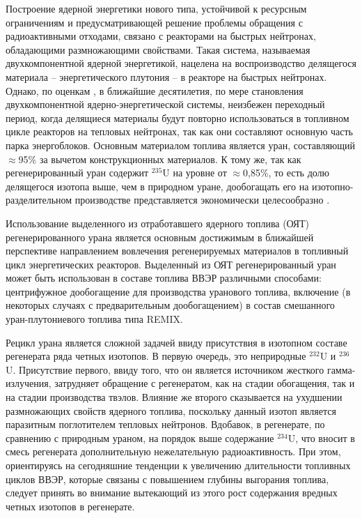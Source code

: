 {\actuality}
Построение ядерной энергетики нового типа, устойчивой к ресурсным ограничениям и предусматривающей решение проблемы обращения с радиоактивными отходами, связано с реакторами на быстрых нейтронах, обладающими размножающими свойствами. Такая система, называемая двухкомпонентной ядерной энергетикой, нацелена на воспроизводство делящегося материала -- энергетического  плутония -- в реакторе на быстрых нейтронах. Однако, по оценкам \cite{andrianovaPERSPEKTIVNYETOPLIVNYEZAGRUZKI2015}, в ближайшие десятилетия, по мере становления двухкомпонентной ядерно-энергетической системы, неизбежен переходный период, когда делящиеся материалы будут повторно использоваться в топливном цикле реакторов на тепловых нейтронах, так как они составляют основную часть парка энергоблоков. Основным материалом топлива является уран, составляющий $\approx$95\% за вычетом конструкционных материалов. К тому же, так как регенерированный уран содержит $^{235}$U на уровне от $\approx$0,85\%, то есть долю делящегося изотопа выше, чем в природном уране, дообогащать его на изотопно-разделительном производстве представляется экономически целесообразно \cite{NikipelovNikipelovSudby}. 

Использование выделенного из отработавшего ядерного топлива (ОЯТ) регенерированного урана является основным достижимым в ближайшей перспективе направлением вовлечения регенерируемых материалов в топливный цикл энергетических реакторов. Выделенный из ОЯТ регенерированный уран может быть использован в составе топлива ВВЭР различными способами: центрифужное дообогащение для производства уранового топлива, включение (в некоторых случаях с предварительным дообогащением) в состав смешанного уран-плутониевого топлива типа REMIX.

Рецикл урана является сложной задачей ввиду присутствия в изотопном составе регенерата ряда четных изотопов. В первую очередь, это неприродные $^{232}$U и $^{236}$U. Присутствие первого, ввиду того, что он является источником жесткого гамма-излучения, затрудняет обращение с регенератом, как на стадии обогащения, так и на стадии производства твэлов. Влияние же второго сказывается на ухудшении размножающих свойств ядерного топлива, поскольку данный изотоп является паразитным поглотителем тепловых нейтронов. Вдобавок, в регенерате, по сравнению с природным ураном, на порядок выше содержание $^{234}$U, что вносит в смесь регенерата дополнительную нежелательную радиоактивность. При этом, ориентируясь на сегодняшние тенденции к увеличению длительности топливных циклов ВВЭР, которые связаны с повышением глубины выгорания топлива, следует принять во внимание вытекающий из этого рост содержания вредных четных изотопов в регенерате.


